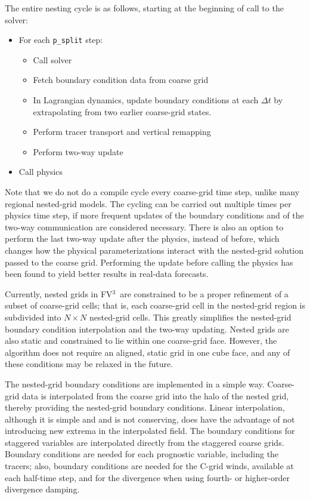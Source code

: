 \documentclass[12pt,letterpaper]{book}
\newcommand{\fv}{FV$^{\mathrm{3}}$}
\begin{document}
The entire nesting cycle is as follows, starting at the beginning of call to the solver:
\begin{itemize} 
\item For each \texttt{p\_split} step:
\begin{itemize}
\item Call solver
\item Fetch boundary condition data from coarse grid 
\item In Lagrangian dynamics, update boundary conditions at each $\Delta t$ by extrapolating from two earlier coarse-grid states.
\item Perform tracer transport and vertical remapping
\item Perform two-way update
\end{itemize}
\item Call physics
\end{itemize}
Note that we do not do a compile cycle every coarse-grid time step, unlike many regional nested-grid models. The cycling can be carried out multiple times per physics time step, if more frequent updates of the boundary conditions and of the two-way communication are considered necessary. There is also an option to perform the last two-way update after the physics, instead of before, which changes how the physical parameterizations interact with the nested-grid solution passed to the coarse grid. Performing the update before calling the physics has been found to yield better results in real-data forecasts.

Currently, nested grids in \fv\ are constrained to be a proper refinement of a subset of coarse-grid cells; that is, each coarse-grid cell in the nested-grid region is subdivided into $N\times N$ nested-grid cells. This greatly simplifies the nested-grid boundary condition interpolation and the two-way updating. Nested grids are also static and constrained to lie within one coarse-grid face. However, the algorithm does not require an aligned, static grid in one cube face, and any of these conditions may be relaxed in the future.

The nested-grid boundary conditions are implemented in a simple way. Coarse-grid data is interpolated from the coarse grid into the halo of the nested grid, thereby providing the nested-grid boundary conditions. Linear interpolation, although it is simple and and is not conserving, does have the advantage of not introducing new extrema in the interpolated field. The boundary conditions for  staggered variables are interpolated directly from the staggered coarse grids. Boundary conditions are needed for each prognostic variable, including the tracers; also, boundary conditions are needed for the C-grid winds, available at each half-time step, and for the divergence when using fourth- or higher-order divergence damping. 
\end{document}
